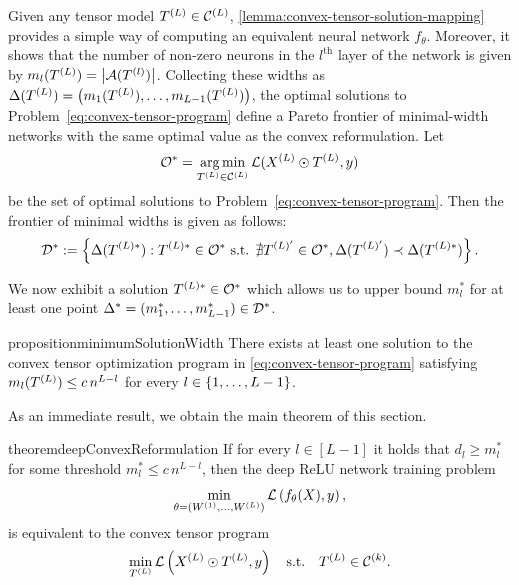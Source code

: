 Given any tensor model \( T^{(L)} \in \mathcal{C}^{(L)} \), \cref{lemma:convex-tensor-solution-mapping}
provides a simple way of computing an equivalent neural network \( f_\theta \).
Moreover, it shows that the number of non-zero neurons in the
\( l^{\text{th}} \) layer of the network is given by
\( m_{l}(T^{(L)}) = \left\vert \mathcal{A}(T^{(l)})\right\vert \).
Collecting these widths as \( \Delta(T^{(L)}) = \left(m_1(T^{(L)}), \ldots, m_{L-1}(T^{(L)})\right) \),
the optimal solutions to Problem~\ref{eq:convex-tensor-program} define
a Pareto frontier of minimal-width networks with the same optimal
value as the convex reformulation.
Let
\begin{equation}\label{eq:tensor-optima}
    \mathcal{O}^* = \mathop{\rm arg\,min}_{T^{(L)} \in \mathcal{C}^{(L)}} \mathcal{L}(X^{(L)} \odot T^{(L)}, y)
\end{equation}
be the set of optimal solutions to Problem~\ref{eq:convex-tensor-program}.
Then the frontier of minimal widths is given as follows:
\begin{equation}
    \mathcal{D}^* :=
    \left\{\Delta(T^{(L)*})
        : T^{(L)*} \in \mathcal{O}^* \text{ s.t. } \nexists T^{(L)'} \in \mathcal{O}^*,
        \Delta(T^{(L)'}) \prec \Delta(T^{(L)*})\right\}.
\end{equation}

We now exhibit a solution \( T^{(L)*} \in \mathcal{O}^* \) which allows us to
upper bound \( m^*_l \) for at least one point
\( \Delta^* = (m^*_1, \ldots, m^*_{L-1}) \in \mathcal{D}^* \).

\begin{restatable}{proposition}{minimumSolutionWidth}\label{prop:convex-minimal-solution-width}
    There exists at least one solution to the convex tensor optimization
    program in \cref{eq:convex-tensor-program} satisfying
    \( m_l(T^{(L)}) \leq c \, n^{L - l} \) for every
    \( l \in \left\{1, \ldots, L-1\right\} \).
\end{restatable}

As an immediate result, we obtain the main theorem of this section.

\begin{restatable}{theorem}{deepConvexReformulation}\label{thm:deep-convex-reformulation}
    If for every \( l \in [L-1]  \) it holds that
    \( d_l \geq m^{*}_{l} \) for some threshold \( m^{*}_{l} \leq c \, n^{L - l} \),
    then the deep ReLU network training problem
    \begin{equation*}
        \min_{\theta = (W^{(1)}, \ldots, W^{(L)})} \mathcal{L}\left(f_{\theta}(X), y\right),
    \end{equation*}
    is equivalent to the convex tensor program
    \begin{equation}
        \min_{T^{(L)}}
        \mathcal{L}\left(X^{(L)} \odot T^{(L)}, y\right) \quad \text{s.t.} \quad
        T^{(L)} \in \mathcal{C}^{(k)}.
    \end{equation}
\end{restatable}

